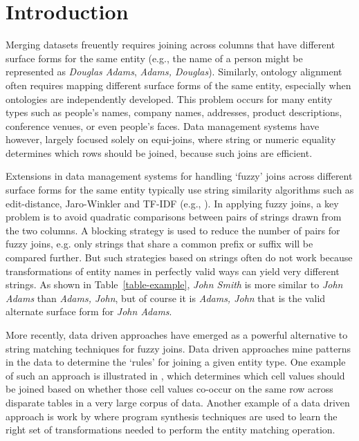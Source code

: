\section{Introduction}

Merging datasets freuently requires joining across columns that have
different surface forms for the same entity (e.g., the name of a
person might be represented as \textit{Douglas Adams},
\textit{Adams, Douglas}).  Similarly,
ontology alignment often requires mapping different surface forms of
the same entity, especially when ontologies are independently
developed.  This problem occurs for many entity types such as people's names, company names, addresses, product descriptions, conference venues, or even people's faces.  Data management systems have however, largely focused solely on equi-joins, where string or numeric equality determines which rows should be joined, because such joins are efficient.

Extensions in data management systems for handling `fuzzy' joins across different surface forms for the same entity typically use string similarity algorithms such as edit-distance, Jaro-Winkler and TF-IDF (e.g., \cite{Cohen2003}).  In applying fuzzy joins, a key problem is to avoid quadratic comparisons between pairs of strings drawn from the two columns.  A blocking strategy is used to reduce the number of pairs for fuzzy joins, e.g. only strings that share a common prefix or suffix will be compared further.  But such strategies based on strings often do not work because transformations of entity names in perfectly valid ways can yield very different strings.  As shown in Table~\ref{table-example}, \textit{John Smith} is more similar to \textit{John Adams} than \textit{Adams, John}, but of course it is \textit{Adams, John} that is the valid alternate surface form for \textit{John Adams}.

More recently, data driven approaches have emerged as a powerful alternative to string matching techniques for fuzzy joins.  Data driven approaches mine patterns in the data to determine the `rules' for joining a given entity type.  One example of such an approach is illustrated in \cite{He:2015:SJS:2824032.2824036}, which determines which cell values should be joined based on whether those cell values co-occur on the same row across disparate tables in a very large corpus of data.  Another example of a data driven approach is work by \cite{auto-join-joining-tables-leveraging-transformations} where program synthesis techniques are used to learn the right set of transformations needed to perform the entity matching operation.  


